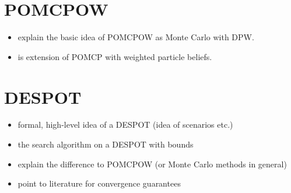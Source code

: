 \section{POMCPOW}

\begin{itemize}
  \item explain the basic idea of POMCPOW as Monte Carlo with DPW.
  \item is extension of POMCP with weighted particle beliefs.
\end{itemize}


\section{DESPOT}

\begin{itemize}
  \item formal, high-level idea of a DESPOT (idea of scenarios etc.)
  \item the search algorithm on a DESPOT with bounds
  \item explain the difference to POMCPOW (or Monte Carlo methods in general)
  \item point to literature for convergence guarantees
\end{itemize}



